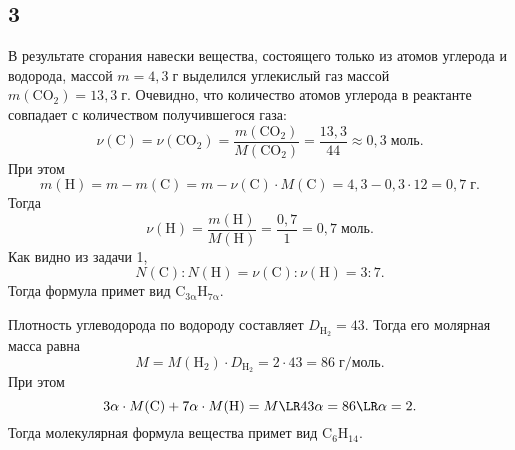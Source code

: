 \subsection{3}

В результате сгорания навески вещества, состоящего только из атомов углерода и водорода, массой $m=4{,}3\;\text{г}$ выделился углекислый газ массой $m(\mathrm{CO_2})=13{,}3\;\text{г}$. Очевидно, что количество атомов углерода в реактанте совпадает с количеством получившегося газа:
\[
\nu(\mathrm{C})=\nu(\mathrm{CO_2})=\frac{m(\mathrm{CO_2})}{M(\mathrm{CO_2})}=\frac{13{,}3}{44}\approx0{,}3\;\text{моль}.
\]
При этом
\[
m(\mathrm{H})=m-m(\mathrm{C})=m-\nu(\mathrm{C})\cdot M(\mathrm{C})=4{,}3-0{,}3\cdot12=0{,}7\;\text{г}.
\]
Тогда
\[
\nu(\mathrm{H})=\frac{m(\mathrm{H})}{M(\mathrm{H})}=\frac{0{,}7}{1}=0{,}7\;\text{моль}.
\]
Как видно из задачи 1,
\[
N(\mathrm{C}):N(\mathrm{H})=\nu(\mathrm{C}):\nu(\mathrm{H})=3:7.
\]
Тогда формула примет вид $\mathrm{C_{3\alpha}H_{7\alpha}}$.

Плотность углеводорода по водороду составляет $D_\mathrm{H_2}=43$. Тогда его молярная масса равна
\[
M=M(\mathrm{H_2})\cdot D_\mathrm{H_2}=2\cdot43=86\;\text{г/моль}.
\]
При этом
\[
3\alpha\cdot M(\mathrm{C})+7\alpha\cdot M(\mathrm{H})=M\LR43\alpha=86\LR\alpha=2.
\]
Тогда молекулярная формула вещества примет вид $\mathrm{C_6H_{14}}$.